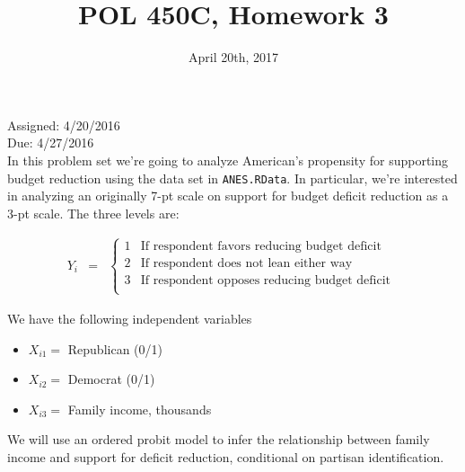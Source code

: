 \documentclass[letterpaper,12pt]{article}
\title{POL 450C, Homework 3}
\date{April 20th, 2017}
\numberwithin{equation}{section}
\numberwithin{equation}{section}
\begin{document}
\maketitle

\noindent Assigned: 4/20/2016\\
Due: 4/27/2016\\

In this problem set we're going to analyze American's propensity for supporting budget reduction using the data set in {\tt ANES.RData}.  In particular, we're interested in analyzing an originally 7-pt scale on support for budget deficit reduction as a 3-pt scale.  The three levels are:

\begin{eqnarray}
Y_{i} & = & \left\{\begin{array}{cl} 1 & \text{If respondent favors reducing budget deficit } \\
 2 &  \text{If respondent does not lean either way } \\
 3 &  \text{If respondent opposes reducing budget deficit }\\
 \end{array}\right. \nonumber
\end{eqnarray}


We have the following independent variables
\begin{itemize}
\item[] $X_{i1} = $ Republican (0/1)
\item[] $X_{i2} = $ Democrat (0/1)
\item[] $X_{i3} = $ Family income, thousands
\end{itemize}

We will use an ordered probit model to infer the relationship between family income and support for deficit reduction, conditional on partisan identification.
\end{document}
